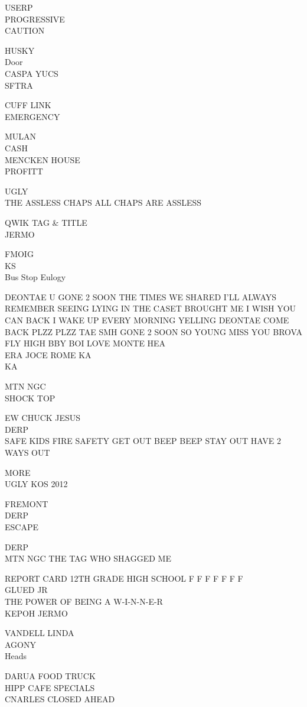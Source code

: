 \documentclass[10pt,letterpaper]{article}
\begin{document}
USERP\\
PROGRESSIVE\\
CAUTION

HUSKY\\
Door\\
CASPA YUCS\\
SFTRA

CUFF LINK\\
EMERGENCY

MULAN\\
CASH\\
MENCKEN HOUSE\\
PROFITT

UGLY\\
THE ASSLESS CHAPS ALL CHAPS ARE ASSLESS

QWIK TAG \& TITLE\\
JERMO

FMOIG\\
KS\\
Bus Stop Eulogy

DEONTAE U GONE 2 SOON THE TIMES WE SHARED I'LL ALWAYS REMEMBER SEEING LYING IN THE CASET BROUGHT ME I WISH YOU CAN BACK I WAKE UP EVERY MORNING YELLING DEONTAE COME BACK PLZZ PLZZ TAE SMH GONE 2 SOON SO YOUNG MISS YOU BROVA FLY HIGH BBY BOI LOVE MONTE HEA\\
ERA JOCE ROME KA\\
KA

MTN NGC\\
SHOCK TOP

EW CHUCK JESUS\\
DERP\\
SAFE KIDS FIRE SAFETY GET OUT BEEP BEEP STAY OUT HAVE 2 WAYS OUT

MORE\\
UGLY KOS 2012

FREMONT\\
DERP\\
ESCAPE

DERP\\
MTN NGC THE TAG WHO SHAGGED ME

REPORT CARD 12TH GRADE HIGH SCHOOL F F F F F F F\\
GLUED JR\\
THE POWER OF BEING A W{-}I{-}N{-}N{-}E{-}R\\
KEPOH JERMO

VANDELL LINDA\\
AGONY\\
Heads

DARUA FOOD TRUCK\\
HIPP CAFE SPECIALS\\
CNARLES CLOSED AHEAD
\end{document}
